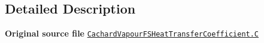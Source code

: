 \subsection{Detailed Description}
{\bfseries Original source file} \href{../../../home/carlo/data/GeN-Foam/GeN-Foam_ffn/GeN-Foam/GeN-Foam/classes/thermalHydraulics/src/physicsModels/heatTransferModels/FSHeatTransferCoefficientModels/subModels/postCHFModels/CachardVapour/CachardVapourFSHeatTransferCoefficient.C}{\tt Cachard\+Vapour\+F\+S\+Heat\+Transfer\+Coefficient.\+C} 